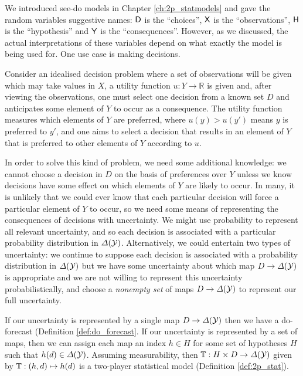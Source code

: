 We introduced see-do models in Chapter \ref{ch:2p_statmodels} and gave the random variables suggestive names: $\mathsf{D}$ is the ``choices'', $\mathsf{X}$ is the ``observations'', $\mathsf{H}$ is the ``hypothesis'' and $\mathsf{Y}$ is the ``consequences''. However, as we discussed, the actual interpretations of these variables depend on what exactly the model is being used for. One use case is making decisions. 

Consider an idealised decision problem where a set of observations will be given which may take values in $X$, a utility function $u:Y\to \mathbb{R}$ is given and, after viewing the observations, one must select one decision from a known set $D$ and anticipates some element of $Y$ to occur as a consequence. The utility function measures which elements of $Y$ are preferred, where $u(y)>u(y')$ means $y$ is preferred to $y'$, and one aims to select a decision that results in an element of $Y$ that is preferred to other elements of $Y$ according to $u$.

In order to solve this kind of problem, we need some additional knowledge: we cannot choose a decision in $D$ on the basis of preferences over $Y$ unless we know decisions have some effect on which elements of $Y$ are likely to occur. In many, it is unlikely that we could ever know that each particular decision will force a particular element of $Y$ to occur, so we need some means of representing the consequences of decisions with uncertainty. We might use probability to represent all relevant uncertainty, and so each decision is associated with a particular probability distribution in $\Delta(\mathcal{Y})$. Alternatively, we could entertain two types of uncertainty: we continue to suppose each decision is associated with a probability distribution in $\Delta(\mathcal{Y})$ but we have some uncertainty about which map $D\to\Delta(\mathcal{Y})$ is appropriate and we are not willing to represent this uncertainty probabilistically, and choose a \emph{nonempty set} of maps $D\to \Delta(\mathcal{Y})$ to represent our full uncertainty. 

If our uncertainty is represented by a single map $D\to \Delta(\mathcal{Y})$ then we have a do-forecast (Definition \ref{def:do_forecast}. If our uncertainty is represented by a set of maps, then we can assign each map an index $h\in H$ for some set of hypotheses $H$ such that $h(d)\in \Delta(\mathcal{Y})$. Assuming measurability, then $\mathbb{T}:H\times D\to \Delta(\mathcal{Y})$ given by $\mathbb{T}:(h,d)\mapsto h(d)$ is a two-player statistical model (Definition \ref{def:2p_stat}).

